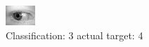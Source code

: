 \begin{figure}[h!]
\begin{center}
\includegraphics[width=0.60\columnwidth]{figures/ID701_class_3_target_4.png}
\end{center}
\caption{ Classification: 3 actual target: 4}
\label{fig:ID701_class_3_target_4}
\end{figure}
